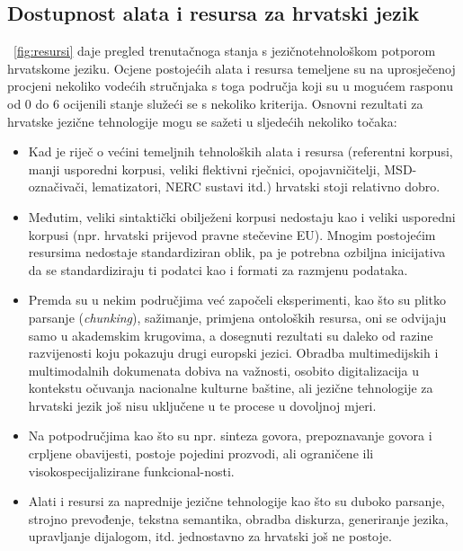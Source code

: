 \begin{multicols}{2}
\subsection{Dostupnost alata i resursa za hrvatski jezik}

~\ref{fig:resursi} daje pregled trenutačnoga stanja s jezičnotehnološkom potporom hrvatskome jeziku. Ocjene postojećih alata i resursa temeljene su na uprosječenoj procjeni nekoliko vodećih stručnjaka s toga područja koji su u mogućem rasponu od 0 do 6 ocijenili stanje služeći se s nekoliko kriterija. Osnovni rezultati za hrvatske jezične tehnologije mogu se sažeti u sljedećih nekoliko točaka:
\begin{itemize}
\item Kad je riječ o većini temeljnih tehnoloških alata i resursa (referentni korpusi, manji usporedni korpusi, veliki flektivni rječnici, opojavničitelji, MSD-označivači, lematizatori, NERC sustavi itd.) hrvatski stoji relativno dobro.
\item Međutim, veliki sintaktički obilježeni korpusi nedostaju kao i veliki usporedni korpusi (npr. hrvatski prijevod pravne stečevine EU). Mnogim postojećim resursima nedostaje standardiziran oblik, pa je potrebna ozbiljna inicijativa da se standardiziraju ti podatci kao i formati za razmjenu podataka.
\item Premda su u nekim područjima već započeli eksperimenti, kao što su plitko parsanje (\emph{chunking}), sažimanje, primjena ontoloških resursa, oni se odvijaju samo u akademskim krugovima, a dosegnuti rezultati su daleko od razine razvijenosti koju pokazuju drugi europski jezici. Obradba multimedijskih i multimodalnih dokumenata dobiva na važnosti, osobito digitalizacija u kontekstu očuvanja nacionalne kulturne baštine, ali jezične tehnologije za hrvatski jezik još nisu uključene u te procese u dovoljnoj mjeri.
\item Na potpodručjima kao što su npr. sinteza govora, prepoznavanje govora i crpljene obavijesti, postoje pojedini prozvodi, ali ograničene ili visokospecijalizirane funkcional-nosti.
\item Alati i resursi za naprednije jezične tehnologije kao što su duboko parsanje, strojno prevođenje, tekstna semantika, obradba diskurza, generiranje jezika, upravljanje dijalogom, itd. jednostavno za hrvatski još ne postoje.
\end{itemize}


\end{multicols}
